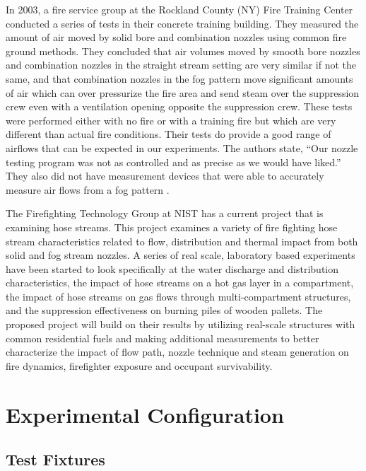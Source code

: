 \documentclass[12pt,oneside]{book}
\begin{document}
In 2003, a fire service group at the Rockland County (NY) Fire Training Center conducted a series of tests in their concrete training building. They measured the amount of air moved by solid bore and combination nozzles using common fire ground methods. They concluded that air volumes moved by smooth bore nozzles and combination nozzles in the straight stream setting are very similar if not the same, and that combination nozzles in the fog pattern move significant amounts of air which can over pressurize the fire area and send steam over the suppression crew even with a ventilation opening opposite the suppression crew. These tests were performed either with no fire or with a training fire but which are very different than actual fire conditions. Their tests do provide a good range of airflows that can be expected in our experiments. The authors state, ``Our nozzle testing program was not as controlled and as precise as we would have liked.'' They also did not have measurement devices that were able to accurately measure air flows from a fog pattern \cite{KnappNozzles1} \cite{KnappNozzles2} \cite{KnappNozzles3}.  

The Firefighting Technology Group at NIST has a current project that is examining hose streams. This project examines a variety of fire fighting hose stream characteristics related to flow, distribution and thermal impact from both solid and fog stream nozzles. A series of real scale, laboratory based experiments have been started to look specifically at the water discharge and distribution characteristics, the impact of hose streams on a hot gas layer in a compartment, the impact of hose streams on gas flows through multi-compartment structures, and the suppression effectiveness on burning piles of wooden pallets. The proposed project will build on their results by utilizing real-scale structures with common residential fuels and making additional measurements to better characterize the impact of flow path, nozzle technique and steam generation on fire dynamics, firefighter exposure and occupant survivability.

\clearpage

\chapter{Experimental Configuration}
\label{chap:exp_config}

\section{Test Fixtures}
\end{document}
